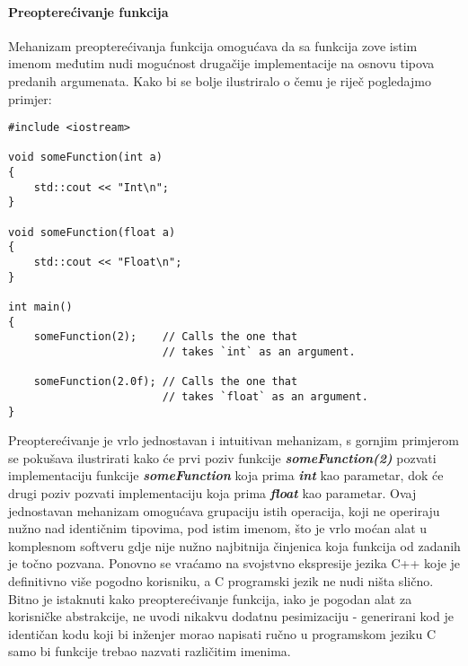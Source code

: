\paragraph{Preopterećivanje funkcija}\label{subsection:functionOverloading}
Mehanizam preopterećivanja funkcija omogućava da sa funkcija zove istim imenom međutim nudi mogućnost drugačije implementacije na osnovu tipova predanih argumenata. Kako bi se bolje ilustriralo o čemu je riječ pogledajmo primjer:
\lstset{language=C++, tabsize=2, frame=single, breaklines=true}
\begin{lstlisting}
#include <iostream>

void someFunction(int a)
{
    std::cout << "Int\n";
}

void someFunction(float a)
{
    std::cout << "Float\n";
}

int main()
{
    someFunction(2);    // Calls the one that
                        // takes `int` as an argument. 
    
    someFunction(2.0f); // Calls the one that 
                        // takes `float` as an argument. 
}
\end{lstlisting}
Preopterećivanje je vrlo jednostavan i intuitivan mehanizam, s gornjim primjerom se pokušava ilustrirati kako će prvi poziv funkcije \textbf{\textit{someFunction(2)}} pozvati implementaciju funkcije \textbf{\textit{someFunction}} koja prima \textbf{\textit{int}} kao parametar, dok će drugi poziv pozvati implementaciju koja prima \textbf{\textit{float}} kao parametar. Ovaj jednostavan mehanizam omogućava grupaciju istih operacija, koji ne operiraju nužno nad identičnim tipovima, pod istim imenom, što je vrlo moćan alat u komplesnom softveru gdje nije nužno najbitnija činjenica koja funkcija od zadanih je točno pozvana. Ponovno se vraćamo na svojstvno ekspresije jezika C++ koje je definitivno više pogodno korisniku, a C programski jezik ne nudi ništa slično. Bitno je istaknuti kako preopterećivanje funkcija, iako je pogodan alat za korisničke abstrakcije, ne uvodi nikakvu dodatnu pesimizaciju - generirani kod je identičan kodu koji bi inženjer morao napisati ručno u programskom jeziku C samo bi funkcije trebao nazvati različitim imenima. 


